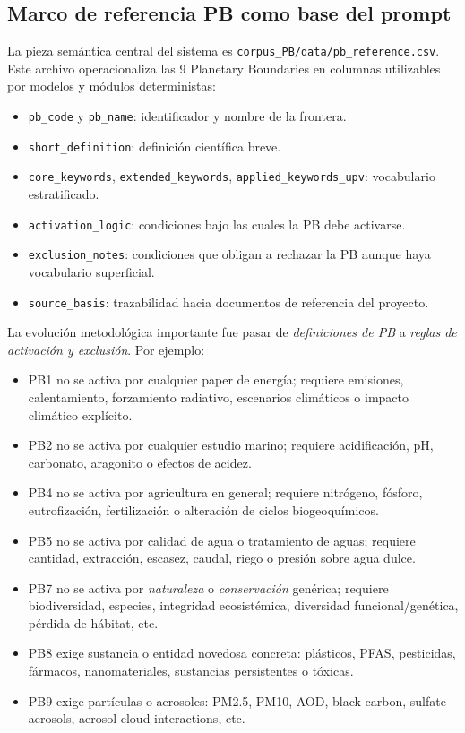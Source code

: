 \subsection{Marco de referencia PB como base del prompt}

La pieza semántica central del sistema es \texttt{corpus\_PB/data/pb\_reference.csv}. Este archivo operacionaliza las 9 Planetary Boundaries en columnas utilizables por modelos y módulos deterministas:

\begin{itemize}
\item \texttt{pb\_code} y \texttt{pb\_name}: identificador y nombre de la frontera.
\item \texttt{short\_definition}: definición científica breve.
\item \texttt{core\_keywords}, \texttt{extended\_keywords}, \texttt{applied\_keywords\_upv}: vocabulario estratificado.
\item \texttt{activation\_logic}: condiciones bajo las cuales la PB debe activarse.
\item \texttt{exclusion\_notes}: condiciones que obligan a rechazar la PB aunque haya vocabulario superficial.
\item \texttt{source\_basis}: trazabilidad hacia documentos de referencia del proyecto.
\end{itemize}

La evolución metodológica importante fue pasar de \emph{definiciones de PB} a \emph{reglas de activación y exclusión}. Por ejemplo:

\begin{itemize}
\item PB1 no se activa por cualquier paper de energía; requiere emisiones, calentamiento, forzamiento radiativo, escenarios climáticos o impacto climático explícito.
\item PB2 no se activa por cualquier estudio marino; requiere acidificación, pH, carbonato, aragonito o efectos de acidez.
\item PB4 no se activa por agricultura en general; requiere nitrógeno, fósforo, eutrofización, fertilización o alteración de ciclos biogeoquímicos.
\item PB5 no se activa por calidad de agua o tratamiento de aguas; requiere cantidad, extracción, escasez, caudal, riego o presión sobre agua dulce.
\item PB7 no se activa por \emph{naturaleza} o \emph{conservación} genérica; requiere biodiversidad, especies, integridad ecosistémica, diversidad funcional/genética, pérdida de hábitat, etc.
\item PB8 exige sustancia o entidad novedosa concreta: plásticos, PFAS, pesticidas, fármacos, nanomateriales, sustancias persistentes o tóxicas.
\item PB9 exige partículas o aerosoles: PM2.5, PM10, AOD, black carbon, sulfate aerosols, aerosol-cloud interactions, etc.
\end{itemize}

